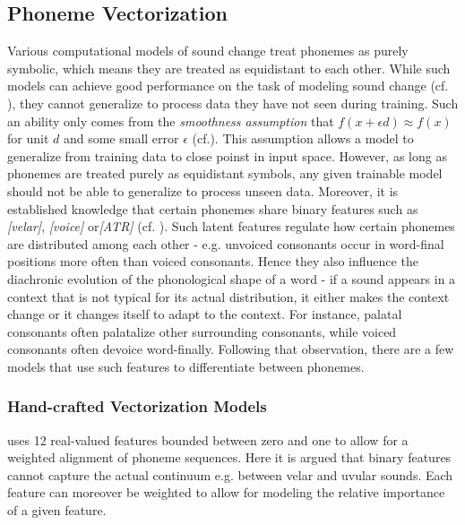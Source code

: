 \documentclass[8pt]{article}
\begin{document}
\subsection{Phoneme Vectorization}
\label{Phoneme Vectorization}
Various computational models of sound change treat phonemes as purely symbolic, which means they are treated as equidistant to each other. While such models can achieve good performance on the task of modeling sound change (cf. \cite{bouchard2007probabilistic,bouchard2013automated}), they cannot generalize to process data they have not seen during training. Such an ability only comes from the \textit{smoothness assumption} that $f(x + \epsilon d) \approx f(x)$ for unit $d$ and some small error $\epsilon$ (cf.\cite[p. 555]{Goodfellow-et-al-2016-Book}). This assumption allows a model to generalize from training data to close poinst in input space.  However, as long as phonemes are treated purely as equidistant symbols, any given trainable model should not be able to generalize to process unseen data.
Moreover, it is established knowledge that certain phonemes share binary features such as \textit{[velar]}, \textit{[voice]}  or\textit{[ATR]} (cf. \cite{chomsky1968sound}). Such latent features regulate how certain phonemes are distributed among each other - e.g. unvoiced consonants occur in word-final positions more often than voiced consonants. Hence they also influence the diachronic evolution of the phonological shape of a word - if a sound appears in a context that is not typical for its actual distribution, it either makes the context change or it changes itself to adapt to the context. For instance, palatal consonants often palatalize other surrounding consonants, while voiced consonants often devoice word-finally.
Following that observation, there are a few models that use such features to differentiate between phonemes. 

\subsubsection{Hand-crafted Vectorization Models}



\cite{kondrak2000new} uses 12 real-valued features bounded between zero and one to allow for a weighted alignment of phoneme sequences. Here it is argued that binary features cannot capture the actual continuum e.g. between velar and uvular sounds. Each feature can moreover be weighted to allow for modeling the relative importance of a given feature.
\end{document}
